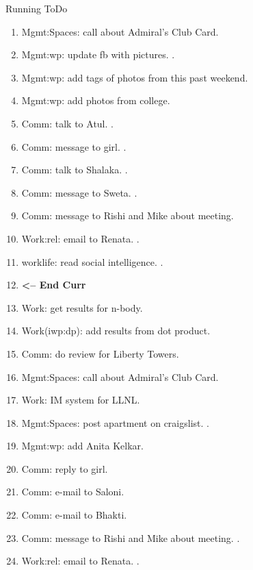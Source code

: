 \begin{columns}
\begin{column}{0.6\linewidth}
\begin{block}{Running ToDo}
\begin{enumerate}
      \item \tiny Mgmt:Spaces: call about Admiral's Club Card. 
        
          
      \item \tiny Mgmt:wp: update fb with pictures. 
         . 
        
      \item \tiny Mgmt:wp: add tags of photos from this past weekend. 
      \item \tiny Mgmt:wp: add photos from college. 
      \item \tiny Comm: talk to Atul.  . 

              
      \item \tiny Comm: message to girl.  . 
      \item \tiny Comm: talk to Shalaka.  .   
      \item \tiny Comm: message to Sweta. . 
  
      \item \tiny Comm: message to Rishi and Mike about meeting.
        \item \tiny Work:rel: email to Renata. . 
        \item \tiny worklife: read social intelligence. .  
          
        \item \tiny \textbf{ <-- End Curr }
          
        \item \tiny Work: get results for n-body.  
        \item \tiny Work(iwp:dp): add results from dot product.
        \item \tiny Comm: do review for Liberty Towers.
        \item \tiny Mgmt:Spaces: call about Admiral's Club Card.
        \item \tiny Work: IM system for LLNL.
        \item \tiny Mgmt:Spaces: post apartment on craigslist. .
        \item \tiny Mgmt:wp: add Anita Kelkar.  
        \item \tiny Comm: reply to girl.  

        \item \tiny Comm: e-mail to Saloni.
        \item \tiny Comm: e-mail to Bhakti. 
        \item \tiny Comm: message to Rishi and Mike about
          meeting. . 
        \item \tiny Work:rel: email to Renata. . 


\end{enumerate}
\end{block}
\end{column}
\end{columns}
